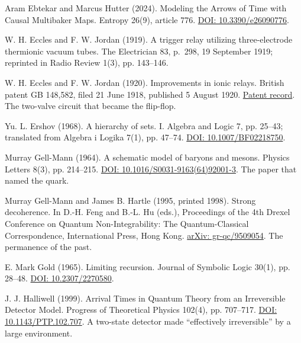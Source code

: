 \documentclass[11pt,twoside]{article}
\theoremstyle{thielethm}
\theoremstyle{thieledef}
\theoremstyle{thieledef}
\theoremstyle{thieledef}
\theoremstyle{thielethm}
\theoremstyle{thieleobs}
\theoremstyle{thielethm}
\begin{document}
\noindent Aram Ebtekar and Marcus Hutter (2024). Modeling the Arrows of Time with Causal Multibaker Maps. Entropy 26(9), article 776. \href{https://doi.org/10.3390/e26090776}{DOI: 10.3390/e26090776}.
\par\medskip

\noindent W. H. Eccles and F. W. Jordan (1919). A trigger relay utilizing three-electrode thermionic vacuum tubes. The Electrician 83, p.~298, 19 September 1919; reprinted in Radio Review 1(3), pp. 143--146.
\par\medskip

\noindent W. H. Eccles and F. W. Jordan (1920). Improvements in ionic relays. British patent GB 148,582, filed 21 June 1918, published 5 August 1920. \href{https://patents.google.com/patent/GB148582A/en}{Patent record}. The two-valve circuit that became the flip-flop.
\par\medskip

\noindent Yu. L. Ershov (1968). A hierarchy of sets. I. Algebra and Logic 7, pp. 25--43; translated from Algebra i Logika 7(1), pp. 47--74. \href{https://doi.org/10.1007/BF02218750}{DOI: 10.1007/BF02218750}.
\par\medskip

\noindent Murray Gell-Mann (1964). A schematic model of baryons and mesons. Physics Letters 8(3), pp. 214--215. \href{https://doi.org/10.1016/S0031-9163(64)92001-3}{DOI: 10.1016/S0031-9163(64)92001-3}. The paper that named the quark.
\par\medskip

\noindent Murray Gell-Mann and James B. Hartle (1995, printed 1998). Strong decoherence. In D.-H. Feng and B.-L. Hu (eds.), Proceedings of the 4th Drexel Conference on Quantum Non-Integrability: The Quantum-Classical Correspondence, International Press, Hong Kong. \href{https://arxiv.org/abs/gr-qc/9509054}{arXiv: gr-qc/9509054}. The permanence of the past.
\par\medskip

\noindent E. Mark Gold (1965). Limiting recursion. Journal of Symbolic Logic 30(1), pp. 28--48. \href{https://doi.org/10.2307/2270580}{DOI: 10.2307/2270580}.
\par\medskip

\noindent J. J. Halliwell (1999). Arrival Times in Quantum Theory from an Irreversible Detector Model. Progress of Theoretical Physics 102(4), pp. 707--717. \href{https://doi.org/10.1143/PTP.102.707}{DOI: 10.1143/PTP.102.707}. A two-state detector made ``effectively irreversible'' by a large environment.
\par\medskip
\end{document}
